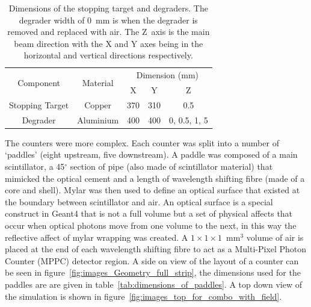 \begin{table}
  \begin{center}
  \begin{tabular}{c | c | c | c | c}
    \multirow{2}{*}{Component}
                     &  \multirow{2}{*}{Material} 
                                   &  \multicolumn{3}{c}{Dimension (mm)}  \\
                     &             &   X   &   Y   &       Z       \\
    \hline
    Stopping Target  &  Copper     &  370  &  310  &      0.5      \\
    Degrader         &  Aluminium  &  400  &  400  & 0, 0.5, 1, 5  \\
    
  \end{tabular}
  \end{center}
  \caption{Dimensions of the stopping target and degraders. The degrader width of 0~mm is when the degrader is removed and replaced with air. The Z~axis is the main beam direction with the X and Y axes being in the horizontal and vertical directions respectively.}
  \label{tab:st_and_deg_dimensions}
\end{table}

The counters were more complex. Each counter was split into a number of `paddles' (eight upstream, five downstream). A paddle was composed of a main scintillator, a 45\(^{\circ}\) section of pipe (also made of scintillator material) that mimicked the optical cement and a length of wavelength shifting fibre (made of a core and shell). Mylar was then used to define an optical surface that existed at the boundary between scintillator and air. An optical surface is a special construct in Geant4 that is not a full volume but a set of physical affects that occur when optical photons move from one volume to the next, in this way the reflective affect of mylar wrapping was created. A \(1\times1\times1\)~mm\(^3\) volume of air is placed at the end of each wavelength shifting fibre to act as a Multi-Pixel Photon Counter (MPPC) detector region. A side on view of the layout of a counter can be seen in figure~\ref{fig:images_Geometry_full_strip}, the dimensions used for the paddles are are given in table~\ref{tab:dimensions_of_paddles}. A top down view of the simulation is shown in figure~\ref{fig:images_top_for_combo_with_field}.

